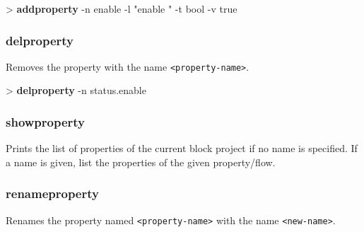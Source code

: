 \documentclass[10pt,a4paper]{article}
\begin{document}
{\begin{sampletitle}
> \textbf{\tool{} addproperty} -n enable -l "enable \kind{}" -t bool -v true
\end{sampletitle}


\subsubsection{delproperty}
\label{subsec:delproperty}

Removes the property with the name \texttt{<property-name>}.\\


\begin{sampletitle}
> \textbf{\tool{} delproperty} -n status.enable
\end{sampletitle}


\subsubsection{showproperty}
\label{subsec:showproperty}

Prints the list of properties of the current block project if no name is specified. If a name is given, list the properties of the given property/flow.

\subsubsection{renameproperty}
\label{subsec:renameproperty}

Renames the property named \texttt{<property-name>} with the name \texttt{<new-name>}.\\

}
\end{document}
